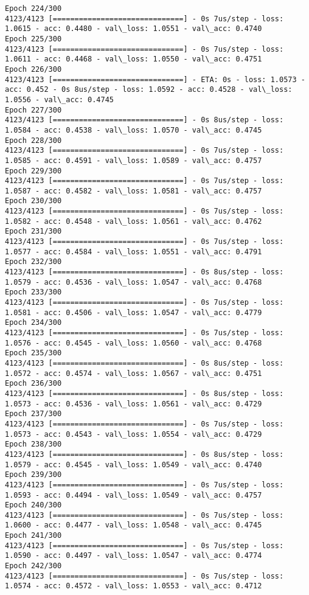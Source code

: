 \documentclass[11pt]{article}
\begin{document}
\begin{Verbatim}[commandchars=\\\{\}]
Epoch 224/300
4123/4123 [==============================] - 0s 7us/step - loss: 1.0615 - acc: 0.4480 - val\_loss: 1.0551 - val\_acc: 0.4740
Epoch 225/300
4123/4123 [==============================] - 0s 7us/step - loss: 1.0611 - acc: 0.4468 - val\_loss: 1.0550 - val\_acc: 0.4751
Epoch 226/300
4123/4123 [==============================] - ETA: 0s - loss: 1.0573 - acc: 0.452 - 0s 8us/step - loss: 1.0592 - acc: 0.4528 - val\_loss: 1.0556 - val\_acc: 0.4745
Epoch 227/300
4123/4123 [==============================] - 0s 8us/step - loss: 1.0584 - acc: 0.4538 - val\_loss: 1.0570 - val\_acc: 0.4745
Epoch 228/300
4123/4123 [==============================] - 0s 7us/step - loss: 1.0585 - acc: 0.4591 - val\_loss: 1.0589 - val\_acc: 0.4757
Epoch 229/300
4123/4123 [==============================] - 0s 7us/step - loss: 1.0587 - acc: 0.4582 - val\_loss: 1.0581 - val\_acc: 0.4757
Epoch 230/300
4123/4123 [==============================] - 0s 7us/step - loss: 1.0582 - acc: 0.4548 - val\_loss: 1.0561 - val\_acc: 0.4762
Epoch 231/300
4123/4123 [==============================] - 0s 7us/step - loss: 1.0577 - acc: 0.4584 - val\_loss: 1.0551 - val\_acc: 0.4791
Epoch 232/300
4123/4123 [==============================] - 0s 8us/step - loss: 1.0579 - acc: 0.4536 - val\_loss: 1.0547 - val\_acc: 0.4768
Epoch 233/300
4123/4123 [==============================] - 0s 7us/step - loss: 1.0581 - acc: 0.4506 - val\_loss: 1.0547 - val\_acc: 0.4779
Epoch 234/300
4123/4123 [==============================] - 0s 7us/step - loss: 1.0576 - acc: 0.4545 - val\_loss: 1.0560 - val\_acc: 0.4768
Epoch 235/300
4123/4123 [==============================] - 0s 8us/step - loss: 1.0572 - acc: 0.4574 - val\_loss: 1.0567 - val\_acc: 0.4751
Epoch 236/300
4123/4123 [==============================] - 0s 8us/step - loss: 1.0573 - acc: 0.4536 - val\_loss: 1.0561 - val\_acc: 0.4729
Epoch 237/300
4123/4123 [==============================] - 0s 7us/step - loss: 1.0573 - acc: 0.4543 - val\_loss: 1.0554 - val\_acc: 0.4729
Epoch 238/300
4123/4123 [==============================] - 0s 8us/step - loss: 1.0579 - acc: 0.4545 - val\_loss: 1.0549 - val\_acc: 0.4740
Epoch 239/300
4123/4123 [==============================] - 0s 7us/step - loss: 1.0593 - acc: 0.4494 - val\_loss: 1.0549 - val\_acc: 0.4757
Epoch 240/300
4123/4123 [==============================] - 0s 7us/step - loss: 1.0600 - acc: 0.4477 - val\_loss: 1.0548 - val\_acc: 0.4745
Epoch 241/300
4123/4123 [==============================] - 0s 7us/step - loss: 1.0590 - acc: 0.4497 - val\_loss: 1.0547 - val\_acc: 0.4774
Epoch 242/300
4123/4123 [==============================] - 0s 7us/step - loss: 1.0574 - acc: 0.4572 - val\_loss: 1.0553 - val\_acc: 0.4712

\end{Verbatim}
\end{document}
